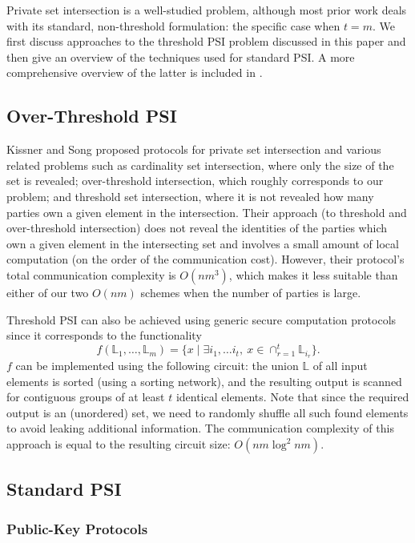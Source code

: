 Private set intersection is a well-studied problem, although most
prior work deals with its standard, non-threshold formulation: the
specific case when $t=m$. We first discuss approaches to the threshold
PSI problem discussed in this paper and then give an overview of the
techniques used for standard PSI. A more comprehensive overview of
the latter is included in \cite{Pinkas}.

\subsection{Over-Threshold PSI}

Kissner and Song \cite{Kissner} proposed protocols for private set
intersection and various related problems such as cardinality set
intersection, where only the size of the set is revealed; over-threshold
intersection, which roughly corresponds to our problem; and threshold
set intersection, where it is not revealed how many parties own a
given element in the intersection. Their approach (to threshold
and over-threshold intersection) does not reveal the identities of
the parties which own a given element in the intersecting set and
involves a small amount of local computation (on the order of the
communication cost). However, their protocol's total communication
complexity is $O(nm^{3})$, which makes it less suitable than either
of our two $O(nm)$ schemes when the number of parties is large.

Threshold PSI can also be achieved using generic secure computation
protocols since it corresponds to the functionality 
\[
f(\mathbb{L}_{1},\ldots,\mathbb{L}_{m})=\{x\mid\exists i_{1},\ldots i_{t},\ x\in\cap_{r=1}^{t}\mathbb{L}_{i_{r}}\}.
\]
$f$ can be implemented using the following circuit: the union $\mathbb{L}$
of all input elements is sorted (using a sorting network), and the
resulting output is scanned for contiguous groups of at least $t$
identical elements. Note that since the required output is an (unordered)
set, we need to randomly shuffle all such found elements to avoid
leaking additional information. The communication complexity of this
approach is equal to the resulting circuit size: $O(nm\log^{2}nm)$.

\subsection{Standard PSI }

\subsubsection{Public-Key Protocols}

